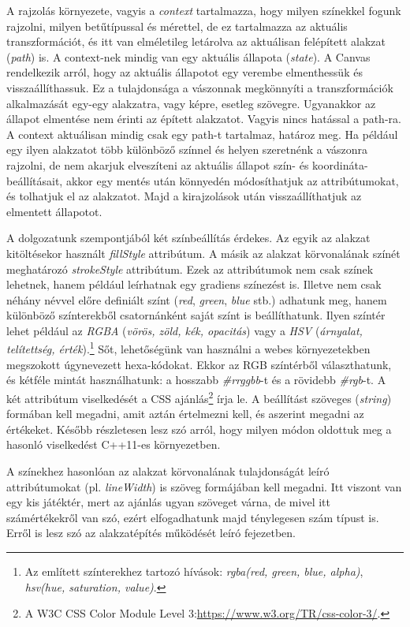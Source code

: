 \documentclass[12pt]{report}
\theoremstyle{definition}
\newcommand{\inenglish}[1]{\textsl{#1}}
\newcommand{\func}[1]{{\textsl{#1}}}
\begin{document}
A rajzolás környezete, vagyis a \emph{context} tartalmazza, hogy milyen
színekkel fogunk rajzolni, milyen betűtípussal és mérettel, de ez tartalmazza
az aktuális transzformációt, és itt van elméletileg letárolva az aktuálisan
felépített alakzat (\inenglish{path}) is. A context-nek mindig van egy aktuális
állapota (\inenglish{state}). A Canvas rendelkezik arról, hogy az aktuális
állapotot egy verembe elmenthessük és visszaállíthassuk. Ez a tulajdonsága a
vászonnak megkönnyíti a transzformációk alkalmazását egy-egy alakzatra, vagy
képre, esetleg szövegre. Ugyanakkor az állapot elmentése nem érinti az épített
alakzatot. Vagyis nincs hatással a path-ra. A context aktuálisan mindig csak
egy path-t tartalmaz, határoz meg. Ha például egy ilyen alakzatot több
különböző színnel és helyen szeretnénk a vászonra rajzolni, de nem akarjuk
elveszíteni az aktuális állapot szín- és koordináta-beállításait, akkor egy
mentés után könnyedén módosíthatjuk az attribútumokat, és tolhatjuk el az
alakzatot. Majd a kirajzolások után visszaállíthatjuk az elmentett állapotot.

A dolgozatunk szempontjából két színbeállítás érdekes. Az egyik az alakzat
kitöltésekor használt \func{fillStyle} attribútum. A másik az alakzat
körvonalának színét meghatározó \func{strokeStyle} attribútum. Ezek az
attribútumok nem csak színek lehetnek, hanem például leírhatnak egy gradiens
színezést is. Illetve nem csak néhány névvel előre definiált színt (\func{red},
\func{green}, \func{blue} stb.) adhatunk meg, hanem különböző színterekből
csatornánként saját színt is beállíthatunk. Ilyen színtér lehet például az
\emph{RGBA} (\emph{vörös, zöld, kék, opacitás}) vagy a \emph{HSV}
(\emph{árnyalat, telítettség, érték}).\footnote{Az említett színterekhez
tartozó hívások: \func{rgba(red, green, blue, alpha)}, \func{hsv(hue,
saturation, value)}.} Sőt, lehetőségünk van használni a webes környezetekben
megszokott úgynevezett hexa-kódokat. Ekkor az RGB színtérből választhatunk, és
kétféle mintát használhatunk: a hosszabb \func{\#rrggbb}-t és a rövidebb
\func{\#rgb}-t. A két attribútum viselkedését a CSS ajánlás\footnote{A W3C CSS
Color Module Level 3:{\footnotesize \url{https://www.w3.org/TR/css-color-3/}}.}
írja le. A beállítást szöveges (\func{string}) formában kell megadni, amit
aztán értelmezni kell, és aszerint megadni az értékeket. Később részletesen
lesz szó arról, hogy milyen módon oldottuk meg a hasonló viselkedést C++11-es
környezetben.

A színekhez hasonlóan az alakzat körvonalának tulajdonságát leíró
attribútumokat (pl. \func{lineWidth}) is szöveg formájában kell megadni. Itt
viszont van egy kis játéktér, mert az ajánlás ugyan szöveget várna, de mivel
itt számértékekről van szó, ezért elfogadhatunk majd ténylegesen szám típust
is. Erről is lesz szó az alakzatépítés működését leíró fejezetben.
\end{document}
